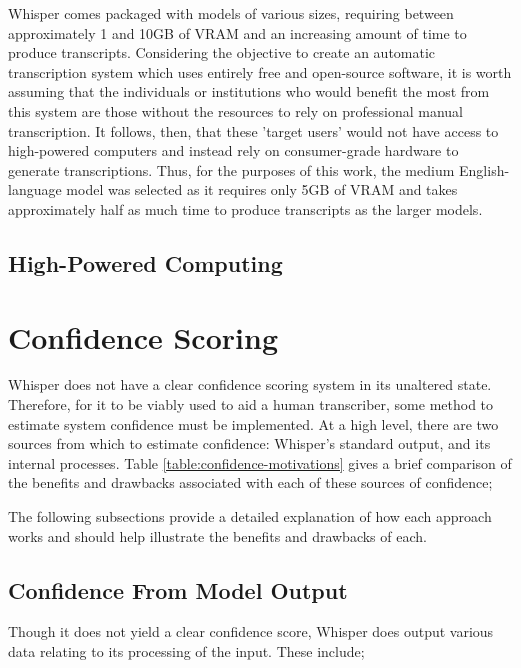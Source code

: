 Whisper comes packaged with models of various sizes, requiring between approximately 1 and 10GB of VRAM and an increasing amount of time to produce transcripts.
Considering the objective to create an automatic transcription system which uses entirely free and open-source software, it is worth assuming that the individuals or institutions who would benefit the most from this system are those without the resources to rely on professional manual transcription.
It follows, then, that these 'target users' would not have access to high-powered computers and instead rely on consumer-grade hardware to generate transcriptions.
Thus, for the purposes of this work, the medium English-language model was selected as it requires only 5GB of VRAM and takes approximately half as much time to produce transcripts as the larger models\cite{whisper}.

\subsection{High-Powered Computing}

\section{Confidence Scoring}

Whisper does not have a clear confidence scoring system in its unaltered state.
Therefore, for it to be viably used to aid a human transcriber, some method to estimate system confidence must be implemented.
At a high level, there are two sources from which to estimate confidence: Whisper's standard output, and its internal processes.
Table \ref{table:confidence-motivations} gives a brief comparison of the benefits and drawbacks associated with each of these sources of confidence;



The following subsections provide a detailed explanation of how each approach works and should help illustrate the benefits and drawbacks of each.

\subsection{Confidence From Model Output}
Though it does not yield a clear confidence score, Whisper does output various data relating to its processing of the input.
These include;

